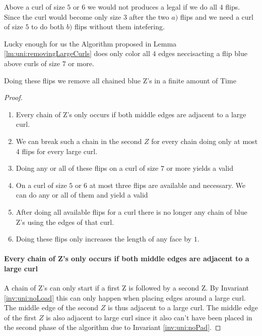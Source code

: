 Above a curl of size $5$ or $6$ we would not produces a legal \rel if we do all $4$ flips. Since the curl would become only size $3$ after the two $a)$ flips and we need a curl of size $5$ to do both $b)$ flips without them intefering.

Lucky enough for us the Algorithm proposed in Lemma \ref{lm:uni:removingLargeCurls} does only color all $4$ edges neccisacting a flip blue above curls of size $7$ or more.




\begin{lemma}
  \label{lm:uni:flips}
  Doing these flips we remove all chained blue Z's in a finite amount of Time
\end{lemma}

\begin{proof}
  \begin{enumerate}
    \item Every chain of Z's only occurs if both middle edges are adjacent to a large curl.
    \item We can break such a chain in the second $Z$ for every chain doing only at most 4 flips for every large curl.
    \item Doing any or all of these flips on a curl of size $7$ or more yields a valid \rel
    \item On a curl of size $5$ or $6$ at most three flips are available and necessary. We can do any or all of them and yield a valid \rel
    \item After doing all available flips for a curl there is no longer any chain of blue Z's using the edges of that curl.
    \item Doing these flips only increases the length of any face by $1$.
  \end{enumerate}

  \paragraph{Every chain of Z's only occurs if both middle edges are adjacent to a large curl}
  A chain of Z's can only start if a first Z is followed by a second Z. By Invariant \ref{inv:uni:noLoad} this can only happen when placing edges around a large curl. The middle edge of the second $Z$ is thus adjacent to a large curl. The middle edge of the first $Z$ is also adjacent to large curl since it also can't have been placed in the second phase of the algorithm due to Invariant \ref{inv:uni:noPad}.


\end{proof}
